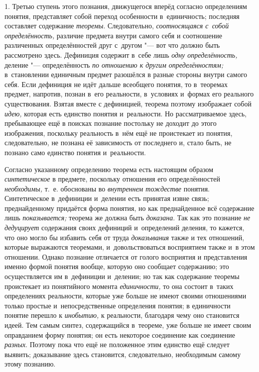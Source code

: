 1. Третью ступень этого познания, движущегося вперёд согласно
определениям понятия, представляет собой переход особенности в~единичность;
последняя составляет содержание {\em теоремы}. Следовательно,
{\em соотносящаяся с~собой
определённость,} различие предмета внутри самого себя и
соотношение различенных определённостей друг с~другом "--- вот
что должно быть рассмотрено здесь. Дефиниция содержит в~себе лишь
{\em одну определённость,} деление "--- определённость {\em по отношению
к другим определённостям;} в~становлении единичным предмет разошёлся
в разные стороны внутри самого себя. Если дефиниция не идёт дальше
всеобщего понятия, то в~теоремах предмет, напротив, познан в~его
реальности, в~условиях и~формах его реального существования. Взятая вместе
с дефиницией, теорема поэтому изображает собой
{\em идею,} которая есть
единство понятия и~реальности. Но рассматриваемое здесь, пребывающее ещё в
поисках познание постольку не доходит до этого изображения, поскольку
реальность в~нём ещё не проистекает из понятия, следовательно, не познана
её зависимость от последнего и, стало быть, не познано само единство
понятия и~реальности.

Согласно указанному определению теорема есть настоящим образом
{\em синтетическое} в
предмете, поскольку отношения его определённостей
{\em необходимы,} т.~е.
обоснованы во {\em внутреннем
тождестве} понятия. Синтетическое в~дефиниции и~делении есть
принятая извне связь; преднайденному придаётся форма понятия, но как
преднайденное всё содержание лишь
{\em показывается;}
теорема же должна быть
{\em доказана}. Так как
это познание {\em не дедуцирует}
содержания своих дефиниций и~определений деления, то кажется,
что оно могло бы избавить себя от труда
{\em доказывания} также и
тех отношений, которые выражаются теоремами, и~довольствоваться восприятием
также и~в этом отношении. Однако познание отличается от голого восприятия и
представления именно формой понятия вообще, которую оно сообщает
содержанию; это осуществляется им в~дефиниции и~делении; но так как
содержание теоремы проистекает из понятийного момента
{\em единичности,} то она
состоит в~таких определениях реальности, которые уже больше не имеют своими
отношениями только простые и~непосредственные определения понятия; в
единичности понятие перешло к
{\em инобытию,} к
реальности, благодаря чему оно становится идеей. Тем самым синтез,
содержащийся в~теореме, уже больше не имеет своим оправданием форму
понятия; он есть некоторое соединение как соединение
{\em разных}. Поэтому
пока что ещё не положенное этим единство ещё следует выявить; доказывание
здесь становится, следовательно, необходимым самому этому познанию.

